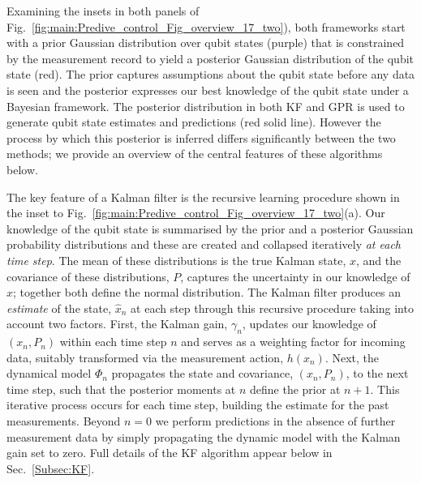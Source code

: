 Examining the insets in both panels of Fig.~\ref{fig:main:Predive_control_Fig_overview_17_two}), both frameworks start with a prior Gaussian distribution over qubit states (purple) that is constrained by the measurement record to yield a posterior Gaussian distribution of the qubit state (red). The prior captures assumptions about the qubit state before any data is seen and the posterior expresses our best knowledge of the qubit state under a Bayesian framework.  The posterior distribution in both KF and GPR is used to generate qubit state estimates and predictions (red solid line).  However the process by which this posterior is inferred differs significantly between the two methods; we provide an overview of the central features of these algorithms below. 

The key feature of a Kalman filter is the recursive learning procedure shown in the inset to Fig.~\ref{fig:main:Predive_control_Fig_overview_17_two}(a). Our knowledge of the qubit state is summarised by the prior and a posterior Gaussian probability distributions and these are created and collapsed iteratively \emph{at each time step}. The mean of these distributions is the true Kalman state, $x$, and the covariance of these distributions, $P$, captures the uncertainty in our knowledge of $x$; together both define the normal distribution. The Kalman filter produces an \emph{estimate} of the state, $\hat{x}_{n}$ at each step through this recursive procedure taking into account two factors. First, the Kalman gain, $\gamma_n$, updates our knowledge of $(x_n, P_n)$ within each time step $n$ and serves as a weighting factor for incoming data, suitably transformed via the measurement action, $h(x_{n})$. Next, the dynamical model $\Phi_n$ propagates the state and covariance, $(x_n, P_n)$, to the next time step, such that the posterior moments at $n$ define the prior at $n+1$.  This iterative process occurs for each time step, building the estimate for the past measurements.  Beyond $n=0$ we perform predictions in the absence of further measurement data by simply propagating the dynamic model with the Kalman gain set to zero.  Full details of the KF algorithm appear below in Sec.~\ref{Subsec:KF}.

